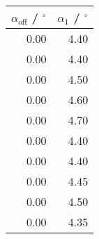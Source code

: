\begin{tabular}{r|r}\\
 $\alpha_\text{off}$ / ${}^\circ$ & $\alpha_1$ / ${}^\circ$  \\
 \hline
0.00 & 4.40\\
0.00 & 4.40\\
0.00 & 4.50\\
0.00 & 4.60\\
0.00 & 4.70\\
0.00 & 4.40\\
0.00 & 4.40\\
0.00 & 4.45\\
0.00 & 4.50\\
0.00 & 4.35
\end{tabular}